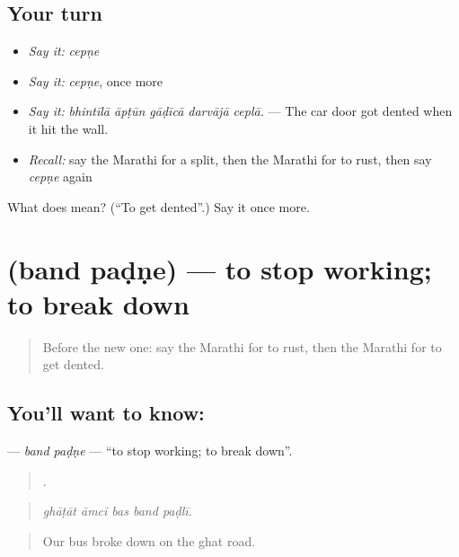 \subsection*{Your turn}
\begin{itemize}
\raggedright
  \item \emph{Say it:} \emph{cepṇe}
  \item \emph{Say it:} \emph{cepṇe}, once more
  \item \emph{Say it:} \emph{bhintīlā āpṭūn gāḍīcā darvājā ceplā.} — The car door got dented when it hit the wall.
  \item \emph{Recall:} say the Marathi for a split, then the Marathi for to rust, then say \emph{cepṇe} again
\end{itemize}

\begin{tcolorbox}[breakable,colback=teal!4,colframe=teal!35!black,title={Before you move on}]
What does  mean? (\textquotedblleft{}To get dented\textquotedblright{}.) Say it once more.
\end{tcolorbox}
\section[\texorpdfstring{\mr{बंद} \mr{पडणे} (band paḍṇe)}{बंद पडणे (band paḍṇe)}]{  (band paḍṇe) — to stop working; to break down}

\label{lesson:MR-C433-band-padne}



\begin{quote}
Before the new one: say the Marathi for to rust, then the Marathi for to get dented.
\end{quote}

\subsection*{You'll want to know:  }
\textbf{ } — \emph{band paḍṇe} — \textquotedblleft{}to stop working; to break down\textquotedblright{}.

\begin{quote}
    .
\end{quote}

\begin{quote}
\emph{ghāṭāt āmcī bas band paḍlī.}
\end{quote}

\begin{quote}
Our bus broke down on the ghat road.
\end{quote}

